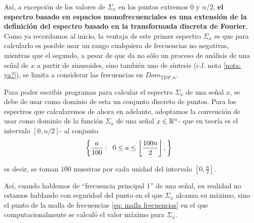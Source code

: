 Así, a excepción de los valores de $\Sigma_{x}$
en los puntos extremos $0$ y $n/2$,
\textbf{el espectro basado en espacios monofrecuenciales
es una extensión de la definición del espectro 
basado en la transformada discreta de Fourier}.
Como ya recordamos al inicio, la
ventaja de este primer espectro $\Sigma_{x}$
es que para calcularlo es posible usar
un rango cualquiera de frecuencias no negativas, mientras que el segundo, 
a pesar de que da no sólo un proceso de análisis de una señal 
de $x$ a partir de sinusoides, sino también uno de síntesis
(c.f. nota \ref{nota: ya?}), se limita a considerar las frecuencias 
en $Dom_{TDF, n}$. \\

\begin{nota}
\label{nota: muestreo dom frecuencia}
Para poder escribir programas
para calcular el espectro $\Sigma_{x}$ de una señal $x$,
se debe de usar como dominio de esta
un conjunto discreto de puntos.
Para los espectros que calcularemos de ahora en 
adelante, adoptamos la convención de 
usar como dominio 
de la función
$\Sigma_{x}$ de una señal $x \in \mathbb{R}^{n}$-
que en teoría es el intervalo $[0, n/2]$-
al conjunto
\begin{equation}
\label{eq: malla frecuencias}
\left\{ \frac{a}{100} : \hspace{0.2cm}
0 \leq a \leq 
\left\lfloor\frac{100n}{2}\right\rfloor,
\right\}
\end{equation}

\noindent
es decir, se toman $100$ muestras por
cada unidad del intervalo 
$\left[ 0, \frac{n}{2}\right]$.

Así, cuando hablemos de ``frecuencia principal 1''
de una señal, en realidad no estamos hablando con seguridad
del punto en el que $\Sigma_{x}$ alcanza su máximo, sino el punto
de la malla de frecuencias \eqref{eq: malla frecuencias} en el que
computacionalmente
se calculó el valor máximo para $\Sigma_{x}$.
\end{nota}


